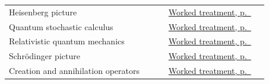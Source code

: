 \documentclass[11pt,oneside]{book}
\begin{document}
\begin{longtable}{p{0.57\linewidth}p{0.35\linewidth}}
\label{index:heisenberg-picture}Heisenberg picture & \hyperref[topic:heisenberg-picture]{Worked treatment, p.~\pageref*{topic:heisenberg-picture}} \\
\label{index:quantum-stochastic-calculus}Quantum stochastic calculus & \hyperref[topic:quantum-stochastic-calculus]{Worked treatment, p.~\pageref*{topic:quantum-stochastic-calculus}} \\
\label{index:relativistic-quantum-mechanics}Relativistic quantum mechanics & \hyperref[topic:relativistic-quantum-mechanics]{Worked treatment, p.~\pageref*{topic:relativistic-quantum-mechanics}} \\
\label{index:schr-dinger-picture}Schrödinger picture & \hyperref[topic:schr-dinger-picture]{Worked treatment, p.~\pageref*{topic:schr-dinger-picture}} \\
\label{index:creation-and-annihilation-operators}Creation and annihilation operators & \hyperref[topic:creation-and-annihilation-operators]{Worked treatment, p.~\pageref*{topic:creation-and-annihilation-operators}} \\
\bottomrule
\end{longtable}
\end{document}
